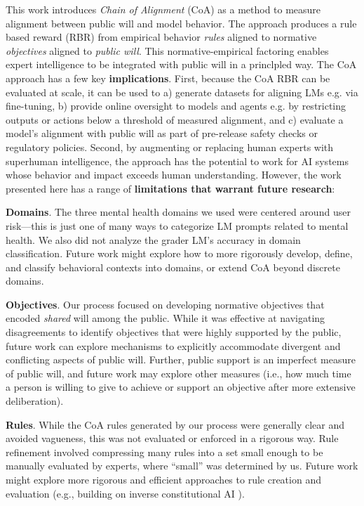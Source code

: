 \documentclass{article}
\begin{document}
This work introduces \emph{Chain of Alignment} (CoA) as a method to measure alignment between public will and model behavior. The approach produces a rule based reward (RBR) from empirical behavior \emph{rules} aligned to normative
\emph{objectives} aligned to \emph{public will}. This normative-empirical factoring enables expert intelligence to be integrated with public will in a princlpled way.
The CoA approach has a few key \textbf{implications}. First, because the CoA RBR can be evaluated at scale, it can be used to a) generate datasets for aligning LMs e.g. via fine-tuning, b) provide online oversight to models and agents e.g. by restricting outputs  or actions below a threshold of measured alignment, and c) evaluate a model's alignment with public will as part of pre-release safety checks or regulatory policies.  Second, by augmenting or replacing human experts with superhuman intelligence, the approach has the potential to work for AI systems whose behavior and impact exceeds human understanding. However, the work presented here has a range of \textbf{limitations that warrant future research}:


\textbf{Domains}. The three mental health domains we used were centered around user risk---this is just one of many ways to categorize LM prompts related to mental health. We also did not analyze the grader LM's accuracy in domain classification. Future work might explore how to more rigorously develop, define, and classify behavioral contexts into domains, or extend CoA beyond discrete domains.

\textbf{Objectives}. Our process focused on developing normative objectives that encoded \emph{shared} will among the public. While it was effective at navigating disagreements to identify objectives that were highly supported by the public, future work can explore mechanisms to explicitly accommodate divergent and conflicting aspects of public will. Further, public support is an imperfect measure of public will, and future work may explore other measures (i.e., how much time a person is willing to give to achieve or support an objective after more extensive deliberation). 

\textbf{Rules}. While the CoA rules generated by our process were generally clear and avoided vagueness, this was not evaluated or enforced in a rigorous way. Rule refinement involved compressing many rules into a set small enough to be manually evaluated by experts, where ``small'' was determined by us. Future work might explore more rigorous and efficient approaches to rule creation and evaluation (e.g., building on inverse constitutional AI \cite{findeis2024inverse}).
\end{document}
